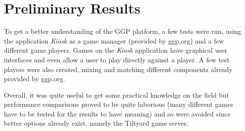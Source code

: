 \chapter{Preliminary Results}
\label{chapter:preliminary_results}

To get a better understanding of the GGP platform, a few tests were run, using the application \textit{Kiosk} as a game manager (provided by ggp.org) and a few different game players.
Games on the \textit{Kiosk} application have graphical user interfaces and even allow a user to play directly against a player.
A few test players were also created, mixing and matching different components already provided by ggp.org.

Overall, it was quite useful to get some practical knowledge on the field but performance comparisons proved to be quite laborious (many different games have to be tested for the results to have meaning) and so were avoided since better options already exist, namely the Tiltyard game server.

 
